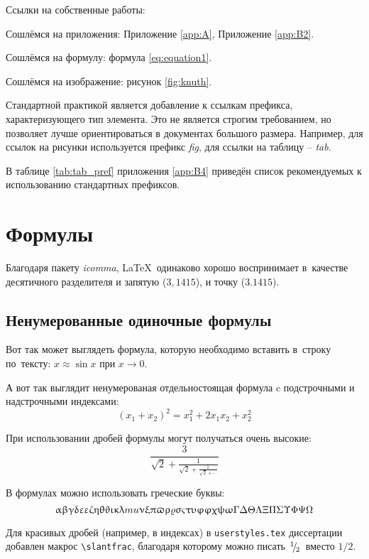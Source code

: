 Ссылки на собственные работы:~\cite{vakbib1, confbib1}

Сошлёмся на приложения: Приложение \ref{app:A}, Приложение \ref{app:B2}.

Сошлёмся на формулу: формула \eqref{eq:equation1}.

Сошлёмся на изображение: рисунок \ref{fig:knuth}.

Стандартной практикой является добавление к ссылкам префикса, характеризующего тип элемента.
Это не является строгим требованием, но позволяет лучше ориентироваться в документах большого размера.
Например, для ссылок на рисунки используется префикс \textit{fig},
для ссылки на таблицу -- \textit{tab}.

В таблице \ref{tab:tab_pref} приложения \ref{app:B4} приведён список рекомендуемых
к использованию стандартных префиксов.

\section{Формулы} \label{sec:ch1/sec3}

Благодаря пакету \textit{icomma}, \LaTeX~одинаково хорошо воспринимает
в~качестве десятичного разделителя и запятую ($3,1415$), и точку ($3.1415$).

\subsection{Ненумерованные одиночные формулы} \label{subsec:ch1/sec3/sub1}

Вот так может выглядеть формула, которую необходимо вставить в~строку
по~тексту: $x \approx \sin x$ при $x \to 0$.

А вот так выглядит ненумерованая отдельностоящая формула c подстрочными
и надстрочными индексами:
\[
(x_1+x_2)^2 = x_1^2 + 2 x_1 x_2 + x_2^2
\]

При использовании дробей формулы могут получаться очень высокие:
\[
  \frac{3}{\sqrt{2}+
  \displaystyle\frac{1}{\sqrt{2}+
  \displaystyle\frac{1}{\sqrt{2}+\cdots}}}
\]

В формулах можно использовать греческие буквы:
\[
\alpha\beta\gamma\delta\epsilon\varepsilon\zeta\eta\theta\vartheta\iota\kappa%
\lambda\\mu\nu\xi\pi\varpi\rho\varrho\sigma\varsigma\tau\upsilon\phi\varphi%
\chi\psi\omega\Gamma\Delta\Theta\Lambda\Xi\Pi\Sigma\Upsilon\Phi\Psi\Omega
\]

Для красивых дробей (например, в индексах) в
\verb+userstyles.tex+ диссертации добавлен макрос
\verb+\slantfrac+, благодаря которому можно
писать $\hspace{3pt}\!^{1}\!\!\hspace{1pt}/ \hspace{2pt}\!\!_{2}\!\hspace{3pt}$ вместо $1/2$.

